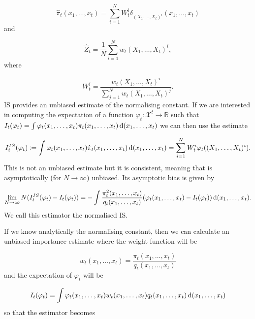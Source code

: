 \begin{equation*}
    \hat{\pi}_t(x_1, \dots, x_t) = \sum_{i=1}^N W_t^i \delta_{(X_1, \dots, X_t)^i}(x_1, \dots, x_t)
\end{equation*}
and

\begin{equation*}
    \hat{Z}_t =  \frac{1}{N} \sum_{i=1}^N w_t (X_1, \dots, X_t)^i,
\end{equation*}
where

\begin{equation*}
    W_t^i = \frac{w_t (X_1, \dots, X_t)^i}{\sum_{j=1}^N w_t (X_1, \dots, X_t)^j}.
\end{equation*}
IS provides an unbiased estimate of the normalising constant. If we are interested in computing the expectation of a function $\varphi_t : \mathcal{X}^t \rightarrow \mathbb{R}$ such that $I_t(\varphi_t) = \int \varphi_t (x_1, \dots, x_t) \pi_t (x_1, \dots, x_t) \operatorname{d}\!{(}x_1, \dots, x_t)$ we can then use the estimate

\begin{equation*}
    I^{IS}_t(\varphi_t) \coloneqq \int \varphi_t(x_1, \dots, x_t) \hat{\pi}_t (x_1, \dots, x_t) \operatorname{d}\!{(}x_1, \dots, x_t) = \sum_{i=1}^N W^i_t\varphi_t((X_1, \dots, X_t)^i).
\end{equation*}
This is not an unbiased estimate but it is consistent, meaning that is asymptotically (for $N \rightarrow \infty$) unbiased. Its asymptotic bias is given by \cite{DoucetTutorial}

\begin{equation*}
    \lim_{N \rightarrow \infty} N (I^{IS}_t(\varphi_t) - I_t(\varphi_t)) = - \int \frac{\pi_t^2 (x_1, \dots, x_t)}{q_t (x_1, \dots, x_t)} (\varphi_t (x_1, \dots, x_t) -  I_t(\varphi_t)) \operatorname{d}\!{(}x_1, \dots, x_t).
\end{equation*}
We call this estimator the normalised IS.

If we know analytically the normalising constant, then we can calculate an unbiased importance estimate where the weight function will be

\begin{equation*}
    w_t(x_1, \dots, x_t) = \frac{\pi_t(x_1, \dots, x_t)}{q_t(x_1, \dots, x_t)}
\end{equation*}
and the expectation of $\varphi_t$ will be

\begin{equation*}
    I_t(\varphi_t) = \int \varphi_t (x_1, \dots, x_t) w_t(x_1, \dots, x_t) q_t (x_1, \dots, x_t) \operatorname{d}\!{(}x_1, \dots, x_t)
\end{equation*}
so that the estimator becomes

